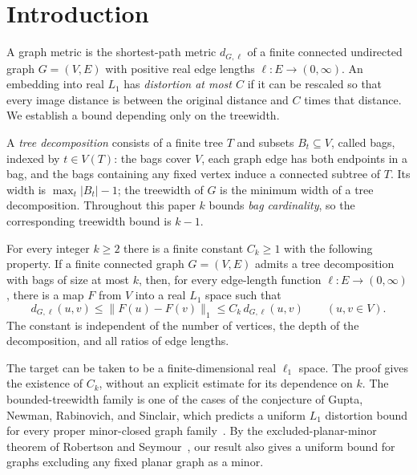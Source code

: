 \begin{abstract}
For every fixed treewidth bound, the shortest-path metrics of finite
connected graphs with arbitrary positive real edge lengths embed into
real $L_1$ with uniformly bounded distortion. This resolves the
bounded-treewidth case of the Gupta--Newman--Rabinovich--Sinclair
conjecture positively.
\end{abstract}
\tableofcontents
\clearpage

\section{Introduction}\label{sec:introduction}
A graph metric is the shortest-path metric $d_{G,\ell}$ of a finite
connected undirected graph $G=(V,E)$ with positive real edge lengths
$\ell:E\to(0,\infty)$. An embedding into real $L_1$ has
\emph{distortion at most $C$} if it can be rescaled so that every
image distance is between the original distance and $C$ times that
distance. We establish a bound depending only on the treewidth.

A \emph{tree decomposition} consists of a finite tree $T$ and subsets
$B_t\subseteq V$, called bags, indexed by $t\in V(T)$: the bags cover
$V$, each graph edge has both endpoints in a bag, and the bags
containing any fixed vertex induce a connected subtree of $T$.
Its width is $\max_t|B_t|-1$; the treewidth of $G$ is the minimum
width of a tree decomposition. Throughout this paper $k$ bounds
\emph{bag cardinality}, so the corresponding treewidth bound is $k-1$.

\begin{theorem}\label{thm:main}
For every integer $k\ge2$ there is a finite constant $C_k\ge1$ with the
following property. If a finite connected graph $G=(V,E)$ admits a tree
decomposition with bags of size at most $k$, then, for every edge-length
function $\ell:E\to(0,\infty)$, there is a map $F$ from $V$ into a real
$L_1$ space such that
\begin{equation}\label{eq:main-embedding}
 d_{G,\ell}(u,v)
 \le \|F(u)-F(v)\|_1
 \le C_k\,d_{G,\ell}(u,v)
 \qquad(u,v\in V).
\end{equation}
The constant is independent of the number of vertices, the depth of the
decomposition, and all ratios of edge lengths.
\end{theorem}

The target can be taken to be a finite-dimensional real $\ell_1$ space.
The proof gives the existence of $C_k$, without an explicit estimate
for its dependence on $k$. The bounded-treewidth family is one of the
cases of the conjecture of Gupta, Newman, Rabinovich, and Sinclair,
which predicts a uniform $L_1$ distortion bound for every proper
minor-closed graph family~\cite{GNRS}. By the excluded-planar-minor
theorem of Robertson and Seymour~\cite{RS86Planar}, our result also
gives a uniform bound for graphs excluding any fixed planar graph
as a minor.

